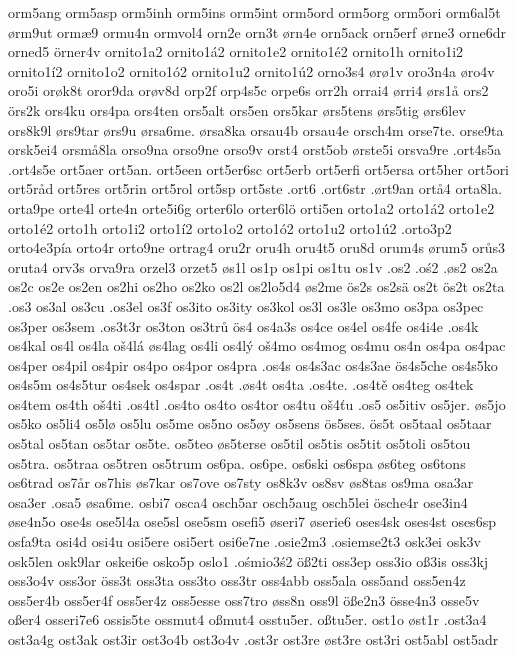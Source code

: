 {{orm5ang
orm5asp
orm5inh
orm5ins
orm5int
orm5ord
orm5org
orm5ori
orm6al5t
ørm9ut
ormæ9
ormu4n
ormvol4
orn2e
orn3t
ørn4e
orn5ack
orn5erf
ørne3
orne6dr
orned5
örner4v
ornito1a2
ornito1á2
ornito1e2
ornito1é2
ornito1h
ornito1i2
ornito1í2
ornito1o2
ornito1ó2
ornito1u2
ornito1ú2
orno3s4
ørø1v
oro3n4a
øro4v
oro5i
orøk8t
oror9da
orøv8d
orp2f
orp4s5c
orpe6s
orr2h
orrai4
ørri4
ørs1å
ors2
örs2k
ors4ku
ors4pa
ors4ten
ors5alt
ors5en
ors5kar
ørs5tens
ørs5tig
ørs6lev
ors8k9l
ørs9tar
ørs9u
ørsa6me.
ørsa8ka
orsau4b
orsau4e
orsch4m
orse7te.
orse9ta
orsk5ei4
orsmå8la
orso9na
orso9ne
orso9v
orst4
orst5ob
ørste5i
orsva9re
.ort4s5a
.ort4s5e
ort5aer
ort5an.
ort5een
ort5er6sc
ort5erb
ort5erfi
ort5ersa
ort5her
ort5ori
ort5råd
ort5res
ort5rin
ort5rol
ort5sp
ort5ste
.ort6
.ort6str
.ørt9an
ortå4
orta8la.
orta9pe
orte4l
orte4n
orte5i6g
orter6lo
orter6lö
orti5en
orto1a2
orto1á2
orto1e2
orto1é2
orto1h
orto1i2
orto1í2
orto1o2
orto1ó2
orto1u2
orto1ú2
.orto3p2
orto4e3pía
orto4r
orto9ne
ortrag4
oru2r
oru4h
oru4t5
oru8d
orum4s
ørum5
orůs3
oruta4
orv3s
orva9ra
orzel3
orzet5
øs1l
os1p
os1pi
os1tu
os1v
.os2
.oś2
.øs2
os2a
os2c
os2e
os2en
os2hi
os2ho
os2ko
os2l
os2lo5d4
øs2me
ös2s
os2sä
os2t
ös2t
os2ta
.os3
os3al
os3cu
.os3el
os3f
os3ito
os3ity
os3kol
os3l
os3le
os3mo
os3pa
os3pec
os3per
os3sem
.os3t3r
os3ton
os3trů
ös4
os4a3s
os4ce
os4el
os4fe
os4i4e
.os4k
os4kal
os4l
os4la
oš4lá
øs4lag
os4li
os4lý
oš4mo
os4mog
os4mu
os4n
os4pa
os4pac
os4per
os4pil
os4pir
os4po
os4por
os4pra
.os4s
os4s3ac
os4s3ae
ös4s5che
os4s5ko
os4s5m
os4s5tur
os4sek
os4spar
.os4t
.øs4t
os4ta
.os4te.
.os4tě
os4teg
os4tek
os4tem
os4th
oš4ti
.os4tl
.os4to
os4to
os4tor
os4tu
oš4ťu
.os5
os5itiv
os5jer.
øs5jo
os5ko
os5li4
os5lø
os5lu
os5me
os5no
os5øy
os5sens
ös5ses.
ös5t
os5taal
os5taar
os5tal
os5tan
os5tar
os5te.
os5teo
øs5terse
os5til
os5tis
os5tit
os5toli
os5tou
os5tra.
os5traa
os5tren
os5trum
os6pa.
os6pe.
os6ski
os6spa
øs6teg
os6tons
os6trad
os7år
os7his
øs7kar
os7ove
os7sty
os8k3v
os8sv
øs8tas
os9ma
osa3ar
osa3er
.osa5
øsa6me.
osbi7
osca4
osch5ar
osch5aug
osch5lei
ösche4r
ose3in4
øse4n5o
ose4s
ose5l4a
ose5sl
ose5sm
osefi5
øseri7
øserie6
oses4sk
oses4st
oses6sp
osfa9ta
osi4d
osi4u
osi5ere
osi5ert
osi6e7ne
.osie2m3
.osiemse2t3
osk3ei
osk3v
osk5len
osk9lar
oskei6e
osko5p
oslo1
.ośmio3ś2
öß2ti
oss3ep
oss3io
oß3is
oss3kj
oss3o4v
oss3or
öss3t
oss3ta
oss3to
oss3tr
oss4abb
oss5ala
oss5and
oss5en4z
oss5er4b
oss5er4f
oss5er4z
oss5esse
oss7tro
øss8n
oss9l
öße2n3
össe4n3
osse5v
oßer4
osseri7e6
ossis5te
ossmut4
oßmut4
osstu5er.
oßtu5er.
ost1o
øst1r
.ost3a4
ost3a4g
ost3ak
ost3ir
ost3o4b
ost3o4v
.ost3r
ost3re
øst3re
ost3ri
ost5abl
ost5adr
}}
